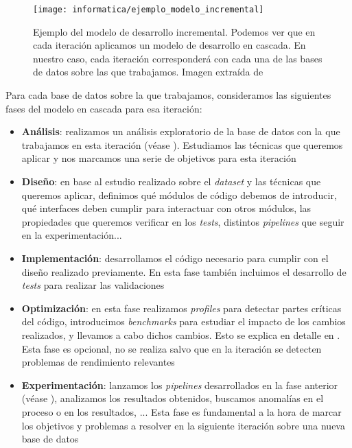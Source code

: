 \begin{figure}[H]
	\centering
	\texttt{[image: informatica/ejemplo\_modelo\_incremental]}
	\caption{Ejemplo del modelo de desarrollo incremental. Podemos ver que en cada iteración aplicamos un modelo de desarrollo en cascada. En nuestro caso, cada iteración corresponderá con cada una de las bases de datos sobre las que trabajamos. Imagen extraída de \cite{informatica:libro_metodologias_desarrollo}}
\end{figure}

Para cada base de datos sobre la que trabajamos, consideramos las siguientes fases del modelo en cascada para esa iteración:

\begin{itemize}
	\item \textbf{Análisis}: realizamos un análisis exploratorio de la base de datos con la que trabajamos en esta iteración (véase ). Estudiamos las técnicas que queremos aplicar y nos marcamos una serie de objetivos para esta iteración
	\item \textbf{Diseño}: en base al estudio realizado sobre el \textit{dataset} y las técnicas que queremos aplicar, definimos qué módulos de código debemos de introducir, qué interfaces deben cumplir para interactuar con otros módulos, las propiedades que queremos verificar en los \textit{tests}, distintos \textit{pipelines} que seguir en la experimentación...
	\item \textbf{Implementación}: desarrollamos el código necesario para cumplir con el diseño realizado previamente. En esta fase también incluimos el desarrollo de \textit{tests} para realizar las validaciones
	\item \textbf{Optimización}: en esta fase realizamos \textit{profiles} para detectar partes críticas del código, introducimos \textit{benchmarks} para estudiar el impacto de los cambios realizados, y llevamos a cabo dichos cambios. Esto se explica en detalle en . Esta fase es opcional, no se realiza salvo que en la iteración se detecten problemas de rendimiento relevantes
	\item \textbf{Experimentación}: lanzamos los \textit{pipelines} desarrollados en la fase anterior (véase ), analizamos los resultados obtenidos, buscamos anomalías en el proceso o en los resultados, ... Esta fase es fundamental a la hora de marcar los objetivos y problemas a resolver en la siguiente iteración sobre una nueva base de datos
\end{itemize}

